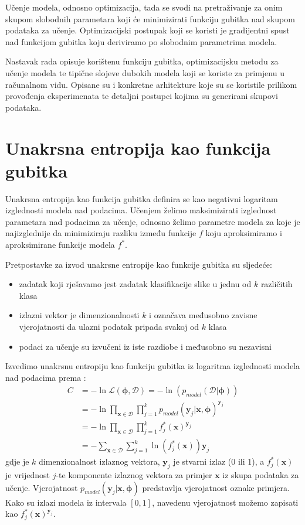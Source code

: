 \documentclass[times, utf8, diplomski, numeric]{fer}
\begin{document}
Učenje modela, odnosno optimizacija, tada se svodi na pretraživanje za onim skupom slobodnih parametara koji će minimizirati funkciju gubitka nad skupom podataka za učenje.
Optimizacijski postupak koji se koristi je gradijentni spust nad funkcijom gubitka koju deriviramo po slobodnim parametrima modela.

Nastavak rada opisuje korištenu funkciju gubitka, optimizacijsku metodu za učenje modela te tipične slojeve dubokih modela koji se koriste za primjenu u računalnom vidu.
Opisane su i konkretne arhitekture koje su se koristile prilikom provođenja eksperimenata te detaljni postupci kojima su generirani skupovi podataka.

\section{Unakrsna entropija kao funkcija gubitka}
Unakrsna entropija kao funkcija gubitka definira se kao negativni logaritam izglednosti modela nad podacima. Učenjem želimo maksimizirati izglednost parametara nad podacima za učenje, odnosno želimo parametre modela za koje je najizglednije da minimiziraju razliku između funkcije $f$ koju aproksimiramo i aproksimirane funkcije modela $f^*$.

Pretpostavke za izvod unakrsne entropije kao funkcije gubitka su sljedeće:
\begin{itemize}
 \item zadatak koji rješavamo jest zadatak klasifikacije slike u jednu od $k$ različitih klasa
 \item izlazni vektor je dimenzionalnosti $k$ i označava međusobno zavisne vjerojatnosti da ulazni podatak pripada svakoj od $k$ klasa
 \item podaci za učenje su izvučeni iz iste razdiobe i međusobno su nezavisni
\end{itemize}

\noindent Izvedimo unakrsnu entropiju kao funkciju gubitka iz logaritma izglednosti modela nad podacima prema \citep{book:machine_learning}:
\begin{align}
 C &= - \ln \mathcal{L}(\boldsymbol{\phi}, \mathcal{D}) = - \ln (p_{model}(\mathcal{D} | \boldsymbol{\phi})) \nonumber \\
 &= - \ln \prod_{\mathbf{x} \in \mathcal{D}} \prod_{j=1}^{k} p_{model}(\mathbf{y}_j | \mathbf{x}, \boldsymbol{\phi})^{\mathbf{y}_j} \nonumber \\
 &= - \ln \prod_{\mathbf{x} \in \mathcal{D}} \prod_{j=1}^{k} f_j^*(\mathbf{x})^{\mathbf{y}_j} \nonumber \\
 &= - \sum_{\mathbf{x} \in \mathcal{D}} \sum_{j=1}^{k} \ln (f_j^*(\mathbf{x})) \mathbf{y}_j \label{eq:neg_log_likelihood}
\end{align}
gdje je $k$ dimenzionalnost izlaznog vektora, $\mathbf{y}_j$ je stvarni izlaz (0 ili 1), a $f_j^*(\mathbf{x})$ je vrijednost $j$-te komponente izlaznog vektora za primjer $\mathbf{x}$ iz skupa podataka za učenje.
Vjerojatnost $p_{model}(\mathbf{y}_j | \mathbf{x}, \boldsymbol{\phi})$ predstavlja vjerojatnost oznake primjera. Kako su izlazi modela iz intervala $\left[ 0, 1\right]$,
navedenu vjerojatnost možemo zapisati kao $f_j^*(\mathbf{x})^{\mathbf{y}_j}$.
\end{document}
